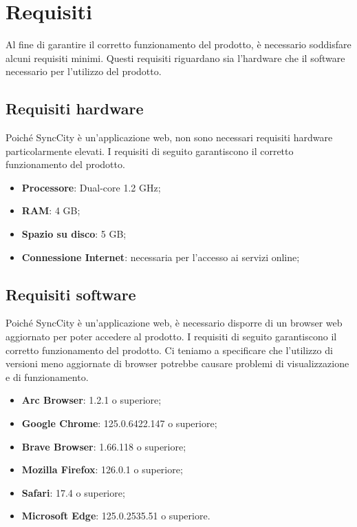 \section{Requisiti}
Al fine di garantire il corretto funzionamento del prodotto, è necessario soddisfare alcuni requisiti minimi. Questi requisiti riguardano sia l'hardware che il software necessario per l'utilizzo del prodotto.
\subsection{Requisiti hardware}
Poiché SyncCity è un'applicazione web, non sono necessari requisiti hardware particolarmente elevati. I requisiti di seguito garantiscono il corretto funzionamento del prodotto.
\begin{itemize}
    \item \textbf{Processore}: Dual-core 1.2 GHz;
    \item \textbf{RAM}: 4 GB;
    \item \textbf{Spazio su disco}: 5 GB;
    \item \textbf{Connessione Internet}: necessaria per l'accesso ai servizi online;
\end{itemize}
\subsection{Requisiti software}
Poiché SyncCity è un'applicazione web, è necessario disporre di un browser web aggiornato per poter accedere al prodotto. I requisiti di seguito garantiscono il corretto funzionamento del prodotto. Ci teniamo a specificare che l'utilizzo di versioni meno aggiornate di browser potrebbe causare problemi di visualizzazione e di funzionamento.
\begin{itemize}
    \item \textbf{Arc Browser}: 1.2.1 o superiore;
    \item \textbf{Google Chrome}: 125.0.6422.147 o superiore;
    \item \textbf{Brave Browser}: 1.66.118 o superiore;
    \item \textbf{Mozilla Firefox}: 126.0.1 o superiore;
    \item \textbf{Safari}: 17.4 o superiore;
    \item \textbf{Microsoft Edge}: 125.0.2535.51 o superiore.
\end{itemize}
